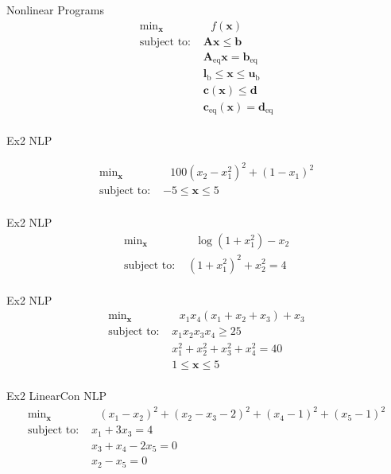 \documentclass{article}
\begin{document}
Nonlinear Programs
\begin{align*}
    \text{min}_{\mathbf{x}}& \text{ } f\left(\mathbf{x}\right) \\
    \mbox{subject to: }& \mathbf{A}\mathbf{x} \le \mathbf{b}\\
                       & \mathbf{A}_{\text{eq}}\mathbf{x} = \mathbf{b}_{\text{eq}}\\
                       & \mathbf{l}_{\text{b}} \le \mathbf{x} \le \mathbf{u}_{\text{b}}\\
                       & \mathbf{c}\left(\mathbf{x}\right) \le \mathbf{d}\\
                       & \mathbf{c}_{\text{eq}}\left(\mathbf{x}\right) = \mathbf{d}_{\text{eq}}\\
\end{align*}

Ex2 NLP

\begin{align*}
    \text{min}_{\mathbf{x}}& \text{ } 100(x_2 - x_1^2)^2 + (1 - x_1)^2 \\
    \mbox{subject to: } & -5 \le \mathbf{x} \le 5\\
\end{align*}

Ex2 NLP
\begin{align*}
    \text{min}_{\mathbf{x}}& \text{ } \log(1+x_1^2) - x_2 \\
    \mbox{subject to: } & \left(1 + x_1^2\right)^2 + x_2^2 = 4\\
\end{align*}

Ex2 NLP
\begin{align*}
    \text{min}_{\mathbf{x}}& \text{ } x_1x_4\left(x_1+x_2+x_3\right) + x_3 \\
    \mbox{subject to: } & x_1x_2x_3x_4 \ge 25\\
                        & x_1^2 + x_2^2 + x_3^2 + x_4^2 = 40\\
                        & 1 \le \mathbf{x} \le 5\\
\end{align*}

Ex2 LinearCon NLP
\begin{align*}
    \text{min}_{\mathbf{x}}& \text{ } (x_1 - x_2)^2 + (x_2 - x_3 - 2)^2 + (x_4  - 1)^2 + (x_5 - 1)^2  \\
    \mbox{subject to: } & x_1 + 3x_3 = 4\\
                        & x_3 + x_4 -2x_5  = 0\\
                        & x_2 - x_5 = 0\\
\end{align*}
\end{document}

